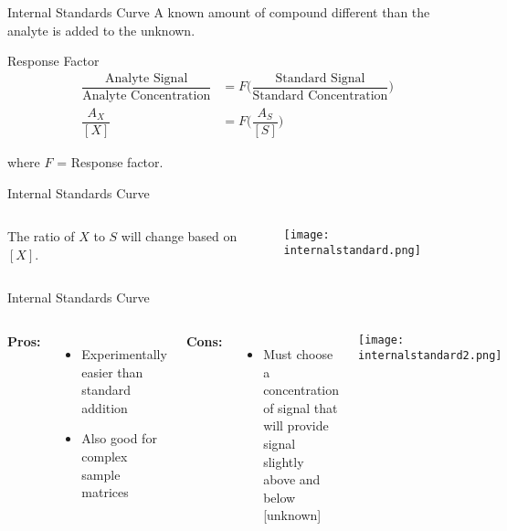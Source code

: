 \documentclass[handout]{beamer}
\begin{document}
\begin{frame}{Internal Standards Curve}
	A known amount of compound \alert{different} than the analyte is added
	to the unknown.

	\bigskip

	\begin{block}{Response Factor}
		\begin{align*}
			\dfrac{\text{Analyte Signal}}{\text{Analyte
			Concentration}} &= F\bigg(\dfrac{\text{Standard
			Signal}}{\text{Standard Concentration}}\bigg) \\
			\dfrac{A_X}{[X]} &= F\bigg(\dfrac{A_S}{[S]}\bigg)
		\end{align*}

		where $F$ = Response factor.
	\end{block}
\end{frame}

\begin{frame}{Internal Standards Curve}
	\begin{columns}
		The ratio of $X$ to $S$ will change based on $[X]$.
		\begin{center}
			\texttt{[image: internalstandard.png]}
		\end{center}
	\end{columns}
\end{frame}

\begin{frame}{Internal Standards Curve}

	\begin{columns}
		\column{0.5\linewidth}
		\textbf{Pros:}

		\begin{itemize}
			\item Experimentally easier than standard addition
			\item Also good for complex sample matrices
		\end{itemize}

		\textbf{Cons:}
		
		\begin{itemize}
			\item Must choose a concentration of signal that will
				provide signal slightly above and below
				[unknown]
		\end{itemize}
		
		\column{0.5\linewidth}
		\begin{center}
			\texttt{[image: internalstandard2.png]}
		\end{center}
	\end{columns}
\end{frame}
\end{document}
